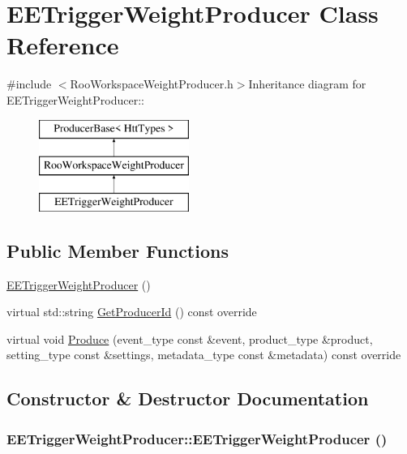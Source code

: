 \hypertarget{classEETriggerWeightProducer}{
\section{EETriggerWeightProducer Class Reference}
\label{classEETriggerWeightProducer}
}


{\ttfamily \#include $<$RooWorkspaceWeightProducer.h$>$}Inheritance diagram for EETriggerWeightProducer::\begin{figure}[H]
\begin{center}
\leavevmode
\includegraphics[height=3cm]{classEETriggerWeightProducer}
\end{center}
\end{figure}
\subsection*{Public Member Functions}
\begin{DoxyCompactItemize}
\item 
\hyperlink{classEETriggerWeightProducer_ac64577094a14b7f4e6b69ef12e260562}{EETriggerWeightProducer} ()
\item 
virtual std::string \hyperlink{classEETriggerWeightProducer_aa3ee349e72e7e9b3b64c582e5cc0d834}{GetProducerId} () const override
\item 
virtual void \hyperlink{classEETriggerWeightProducer_a1b3bd9104cf404304cecc13e4425dc07}{Produce} (event\_\-type const \&event, product\_\-type \&product, setting\_\-type const \&settings, metadata\_\-type const \&metadata) const override
\end{DoxyCompactItemize}


\subsection{Constructor \& Destructor Documentation}
\hypertarget{classEETriggerWeightProducer_ac64577094a14b7f4e6b69ef12e260562}{
\subsubsection[{EETriggerWeightProducer}]{\setlength{\rightskip}{0pt plus 5cm}EETriggerWeightProducer::EETriggerWeightProducer ()}}
\label{classEETriggerWeightProducer_ac64577094a14b7f4e6b69ef12e260562}


